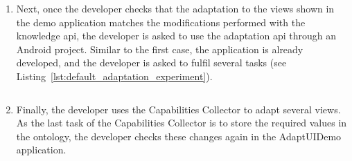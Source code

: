 \begin{enumerate}
  \item Next, once the developer checks that the adaptation to the views shown
  in the demo application matches the modifications performed with the knowledge 
  \ac{api}, the developer is asked to use the adaptation \ac{api} through an
  Android project. Similar to the first case, the application is already developed,
  and the developer is asked to fulfil several tasks (see 
  Listing~\ref{lst:default_adaptation_experiment}).

  \inputminted[linenos=true, fontsize=\footnotesize, frame=lines]{java}{5_experiments_and_results/default_adaptation_experiment.java}
  
  \item Finally, the developer uses the Capabilities Collector to adapt several
  views. As the last task of the Capabilities Collector is to store the required
  values in the ontology, the developer checks these changes again in the AdaptUIDemo
  application.
  
\end{enumerate}



